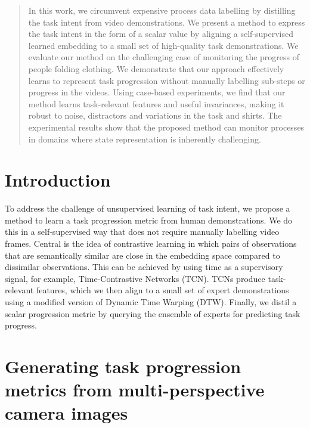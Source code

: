 \begin{abstract}

    In this work, we circumvent expensive process data labelling by distilling the task intent from video demonstrations. We present a method to express the task intent in the form of a scalar value by aligning a self-supervised learned embedding to a small set of high-quality task demonstrations.
    We evaluate our method on the challenging case of monitoring the progress of people folding clothing.
    We demonstrate that our approach effectively learns to represent task progression without manually labelling sub-steps or progress in the videos.
    Using case-based experiments, we find that our method learns task-relevant features and useful invariances, making it robust to noise, distractors and variations in the task and shirts.
    The experimental results show that the proposed method can monitor processes in domains where state representation is inherently challenging.

\end{abstract}


\section{Introduction}


To address the challenge of unsupervised learning of task intent, we propose a method to learn a task progression metric from human demonstrations. We do this in a self-supervised way that does not require manually labelling video frames. Central is the idea of contrastive learning in which pairs of observations that are semantically similar are close in the embedding space compared to dissimilar observations. This can be achieved by using time as a supervisory signal, for example, Time-Contrastive Networks (TCN)\cite{Sermanet2017TCN}. TCNs produce task-relevant features, which we then align to a small set of expert demonstrations using a modified version of Dynamic Time Warping (DTW). Finally, we distil a scalar progression metric by querying the ensemble of experts for predicting task progress.




\section{Generating task progression metrics from multi-perspective camera images}  \label{sec:methodology}

